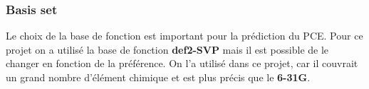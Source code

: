 \subsubsection{Basis set}
Le choix de la base de fonction est important pour la prédiction du PCE. 
Pour ce projet on a utilisé la base de fonction \textbf{def2-SVP} mais il est possible de le changer en fonction de la préférence. 
On l'a utilisé dans ce projet, car il couvrait un grand nombre d'élément chimique et est plus précis que le \textbf{6-31G}.


